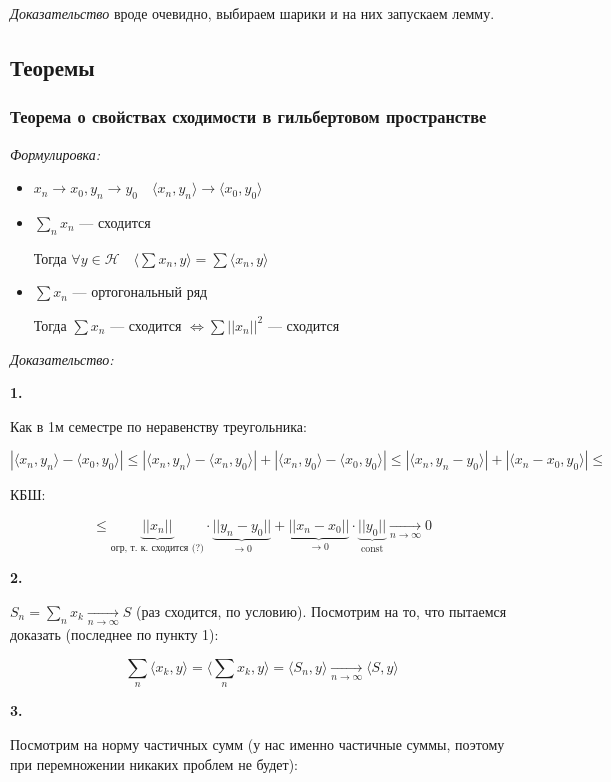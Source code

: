 \documentclass{article}
\def\goesto#1{\underset{#1}{\longrightarrow}}
\def\toinf#1{\goesto{#1 \rightarrow \infty}}
\def\ntoinf{\toinf{n}}
\def\sk#1#2{\langle #1, #2 \rangle}
\DeclareMathOperator{\const}{const}
\begin{document}
\textit{Доказательство} вроде очевидно, выбираем шарики и на них запускаем лемму.

\newpage

\subsection{Теоремы}
\subsubsection{Теорема о свойствах сходимости в гильбертовом пространстве}
\textit{Формулировка:}

\begin{itemize}
    \item $x_n \rightarrow x_0, y_n \rightarrow y_0 \quad \langle x_n, y_n \rangle \rightarrow \langle x_0, y_0 \rangle$
    \item $\sum_n x_n$ --- сходится
    
    Тогда $\forall y \in \mathcal{H} \quad \langle \sum x_n , y\rangle = \sum \langle x_n, y \rangle$

    \item $\sum x_n$ --- ортогональный ряд
    
    Тогда $\sum x_n$ --- сходится $\Leftrightarrow \sum ||x_n||^2$ --- сходится
\end{itemize}

\textit{Доказательство:}

\textbf{1.}

Как в 1м семестре по неравенству треугольника:

\[|\sk{x_n}{y_n} -\sk{x_0}{y_0}| \le |\sk{x_n}{y_n} - \sk{x_n}{y_0}| + |\sk{x_n}{y_0} - \sk{x_0}{y_0}| \le |\sk{x_n}{y_n - y_0}| + |\sk{x_n - x_0}{y_0}| \le \]

КБШ:

\[ \le \underbrace{||x_n||}_{\text{огр, т. к. сходится (?)}} \cdot \underbrace{||y_n - y_0||}_{\rightarrow 0} + \underbrace{||x_n - x_0||}_{\rightarrow 0} \cdot \underbrace{||y_0||}_{\const} \ntoinf 0\]

\textbf{2.}

$S_n = \sum_n x_k \ntoinf S$ (раз сходится, по условию). Посмотрим на то, что пытаемся доказать (последнее по пункту 1):

\[\sum_n \sk{x_k}{y} = \sk{\sum_n x_k}{y} = \sk{S_n}{y} \ntoinf \sk{S}{y}\]

\textbf{3.}

Посмотрим на норму частичных сумм (у нас именно частичные суммы, поэтому при перемножении никаких проблем не будет):
\end{document}
